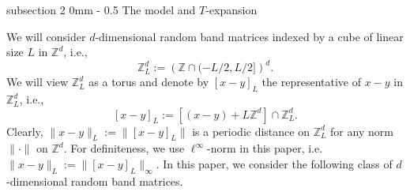 \documentclass{article}
\makeatletter
\newcommand{\1}{\mathds{1}}
\numberwithin{equation}{section}
\newcommand{\be}{\begin{equation}}
\newcommand{\ee}{\end{equation}}
\renewcommand{\geq}{\geqslant}
\renewcommand{\ge}{\geq}
\newcommand{\N}{\mathbb{N}}
\newcommand{\Z}{\mathbb{Z}}
\theoremstyle{plain} %
\theoremstyle{remark}
\renewcommand{\subsection}{\@startsection
	{subsection}%
	{2}%
	{0mm}%
	{-\baselineskip}%
	{0.5\baselineskip}%
	{\normalfont\bf\itshape}} %
\makeatother
\begin{document}
 

\subsection{The model and $T$-expansion} 

We will consider $d$-dimensional random band matrices indexed by a cube of linear size \(L\) in \(\mathbb{Z}^{d}\), i.e., 
\be\label{ZLd}
\Z_L^d:=\left( \Z\cap ( -L/2 , L/2]\right) ^d. 
\ee
We will view $\Z_L^d$ as a torus and denote  by  $[x-y]_L$ the representative of $x-y$ in $\Z_L^d$, i.e.,  
\be\label{representativeL}[x-y]_L:= \left[(x-y)+L\Z^d\right]\cap \Z_L^d.\ee
Clearly, $\|x-y\|_L:=\| [x-y]_L \|$ is a {periodic} distance on $\Z_L^d$ for any norm $\|\cdot\|$ on $\Z^d$. For definiteness, we use $\ell^\infty$-norm in this paper, i.e. $\|x-y\|_L:=\|[x-y]_L\|_\infty$. In this paper, we consider the following class of $d$-dimensional random band matrices. 
\end{document}
